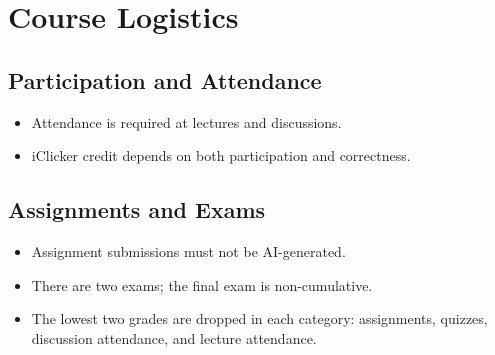 \chapter{Course Logistics}

\section{Participation and Attendance}
\begin{itemize}
    \item Attendance is required at lectures and discussions.
    \item iClicker credit depends on both participation and correctness.
\end{itemize}

\section{Assignments and Exams}
\begin{itemize}
    \item Assignment submissions must not be AI-generated.
    \item There are two exams; the final exam is non-cumulative.
    \item The lowest two grades are dropped in each category:
          assignments, quizzes, discussion attendance, and lecture attendance.
\end{itemize}
